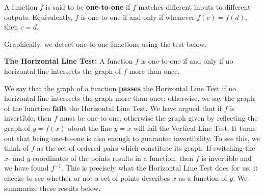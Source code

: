 \smallskip

\colorbox{ResultColor}{\bbm

\begin{defn} \label{onetoone} A function $f$ is said to be  \textbf{one-to-one} if $f$ matches different inputs to different outputs.  Equivalently, $f$ is one-to-one if and only if  whenever $f(c) = f(d)$, then $c=d$. 

\end{defn}
\ebm}

\smallskip

Graphically, we detect one-to-one functions using the test below.

\smallskip

\colorbox{ResultColor}{\bbm

\begin{thm}  \textbf{ The Horizontal Line Test:} A function $f$ is one-to-one if and only if no horizontal line intersects the graph of $f$ more than once.

\label{HLT}

\end{thm}

\ebm}

\smallskip

We say that the graph of a function \textbf{passes} the Horizontal Line Test  if no horizontal line intersects the graph more than once; otherwise, we say the graph of the function \textbf{fails} the Horizontal Line Test.  We have argued that if $f$ is invertible, then $f$ must be one-to-one, otherwise the graph given by reflecting the graph of $y = f(x)$ about the line $y = x$ will fail the Vertical Line Test. It turns out that being one-to-one is also enough to guarantee invertibility.  To see this, we think of $f$ as the set of ordered pairs which constitute its graph.  If switching the $x$- and $y$-coordinates of the points results in a function, then $f$ is invertible and we have found $f^{-1}$. This is precisely what the Horizontal Line Test does for us:  it checks to see whether or not a set of points describes $x$ as a function of $y$.  We summarize these results below.
  
\smallskip

